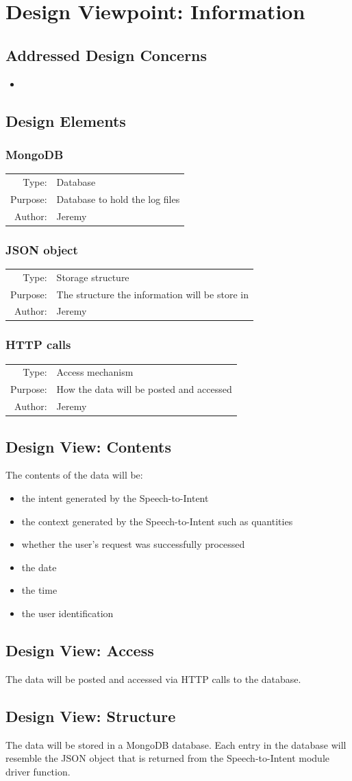 \documentclass[onecolumn, draftclsnofoot,10pt, compsoc]{IEEEtran}
\newcommand{\designElementDef}[4]{
    \subsubsection{#1}
    \begin{tabular}[t]{r p{6in}}
        Type: & #2 \\
        Purpose: & #3 \\
        Author: & #4 \\
    \end{tabular}
}
\begin{document}
\section{Design Viewpoint: Information}
	\subsection{Addressed Design Concerns}
		\begin{itemize}
			\item
		\end{itemize}


	\subsection{Design Elements}
		\designElementDef{MongoDB}{Database}{Database to hold the log files}{Jeremy}
		\designElementDef{JSON object}{Storage structure}{The structure the information will be store in}{Jeremy}
		\designElementDef{HTTP calls}{Access mechanism}{How the data will be posted and accessed}{Jeremy}
	
	\subsection{Design View: Contents}
		The contents of the data will be:
		\begin{itemize}
			\item the intent generated by the Speech-to-Intent
			\item the context generated by the Speech-to-Intent such as quantities
			\item whether the user's request was successfully processed
			\item the date
			\item the time
			\item the user identification
		\end{itemize}
	
	\subsection{Design View: Access}
		The data will be posted and accessed via HTTP calls to the database.
	
	\subsection{Design View: Structure}
		The data will be stored in a MongoDB database.
		Each entry in the database will resemble the JSON object that is returned from the Speech-to-Intent module driver function.
		
\end{document}
